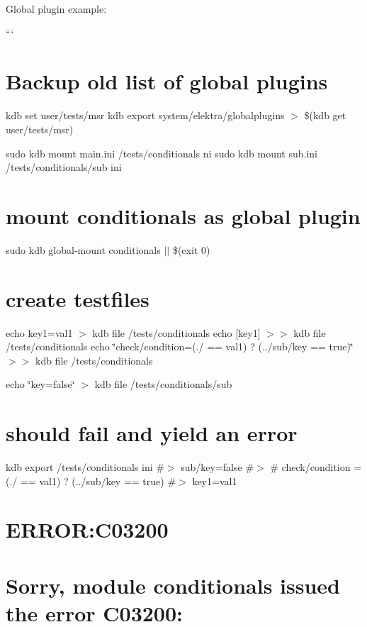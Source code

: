 Global plugin example\+:

``` \section*{Backup old list of global plugins}

kdb set user/tests/msr  kdb export system/elektra/globalplugins $>$ \$(kdb get user/tests/msr)

sudo kdb mount main.\+ini /tests/conditionals ni sudo kdb mount sub.\+ini /tests/conditionals/sub ini

\section*{mount conditionals as global plugin}

sudo kdb global-\/mount conditionals $\vert$$\vert$ \$(exit 0)

\section*{create testfiles}

echo \textquotesingle{}key1=val1\textquotesingle{} $>$ {\ttfamily kdb file /tests/conditionals} echo \textquotesingle{}\mbox{[}key1\mbox{]}\textquotesingle{} $>$$>$ {\ttfamily kdb file /tests/conditionals} echo \char`\"{}check/condition=(./ == \textquotesingle{}val1\textquotesingle{}) ? (../sub/key == \textquotesingle{}true\textquotesingle{})\char`\"{} $>$$>$ {\ttfamily kdb file /tests/conditionals}

echo \char`\"{}key=false\char`\"{} $>$ {\ttfamily kdb file /tests/conditionals/sub}

\section*{should fail and yield an error}

kdb export /tests/conditionals ini \#$>$ sub/key=false \#$>$ \# check/condition = (./ == \textquotesingle{}val1\textquotesingle{}) ? (../sub/key == \textquotesingle{}true\textquotesingle{}) \#$>$ key1=val1 \section*{E\+R\+R\+OR\+:C03200}

\section*{Sorry, module conditionals issued the error C03200\+:}

